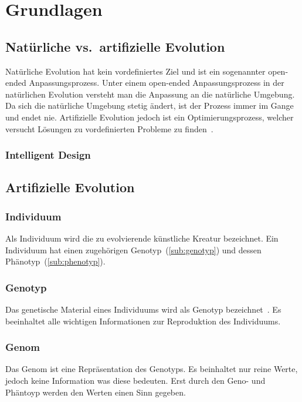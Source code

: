 %
%


\chapter{Grundlagen}

\section{Natürliche vs.\ artifizielle Evolution}

  Natürliche Evolution hat kein vordefiniertes Ziel und ist ein sogenannter open-ended Anpassungsprozess.
  Unter einem open-ended Anpassungsprozess in der natürlichen Evolution versteht man die Anpassung an die natürliche Umgebung.
  Da sich die natürliche Umgebung stetig ändert, ist der Prozess immer im Gange und endet nie.
  Artifizielle Evolution jedoch ist ein Optimierungsprozess,
  welcher versucht Lösungen zu vordefinierten Probleme zu finden~\cite[S.1]{book:bioInspired}.

  \subsection{Intelligent Design\label{sub:IntelligentDesign}}


\section{Artifizielle Evolution}

    \subsection{Individuum\label{sub:individual}}
      Als Individuum wird die zu evolvierende künstliche Kreatur bezeichnet.
      Ein Individuum hat einen zugehörigen Genotyp~(\vref{sub:genotyp}) und dessen Phänotyp~(\vref{sub:phenotyp}).
    \subsection{Genotyp\label{sub:genotyp}}
      Das genetische Material eines Individuums wird als Genotyp bezeichnet~\cite[S.5]{book:bioInspired}.
      Es beeinhaltet alle wichtigen Informationen zur Reproduktion des Individuums.
    \subsection{Genom\label{sub:genom}}
      Das Genom ist eine Repräsentation des Genotyps.
      Es beinhaltet nur reine Werte, jedoch keine Information was diese bedeuten.
      Erst durch den Geno- und Phäntoyp werden den Werten einen Sinn gegeben.

